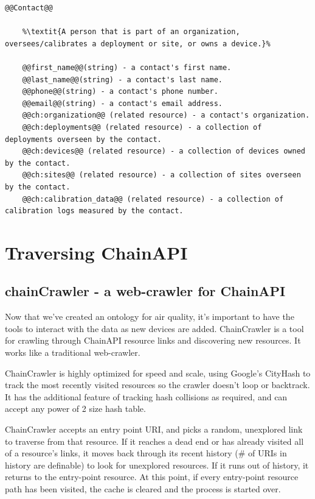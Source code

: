 \begin{lstlisting}[style=codedef]
@@Contact@@
	
	%\textit{A person that is part of an organization, oversees/calibrates a deployment or site, or owns a device.}%

	@@first_name@@(string) - a contact's first name.
	@@last_name@@(string) - a contact's last name.
	@@phone@@(string) - a contact's phone number.
	@@email@@(string) - a contact's email address.
	@@ch:organization@@ (related resource) - a contact's organization.
	@@ch:deployments@@ (related resource) - a collection of deployments overseen by the contact.
	@@ch:devices@@ (related resource) - a collection of devices owned by the contact.
	@@ch:sites@@ (related resource) - a collection of sites overseen by the contact.
	@@ch:calibration_data@@ (related resource) - a collection of calibration logs measured by the contact.

\end{lstlisting}






\section{Traversing ChainAPI}

\subsection{chainCrawler - a web-crawler for ChainAPI}

Now that we've created an ontology for air quality, it's important to have the tools to interact with the data as new devices are added.  ChainCrawler is a tool for crawling through ChainAPI resource links and discovering new resources.  It works like a traditional web-crawler.  

ChainCrawler is highly optimized for speed and scale, using Google's CityHash to track the most recently visited resources so the crawler doesn't loop or backtrack.  It has the additional feature of tracking hash collisions as required, and can accept any power of 2 size hash table.  

ChainCrawler accepts an entry point URI, and picks a random, unexplored link to traverse from that resource.  If it reaches a dead end or has already visited all of a resource's links, it moves back through its recent history (# of URIs in history are definable) to look for unexplored resources.  If it runs out of history, it returns to the entry-point resource.  At this point, if every entry-point resource path has been visited, the cache is cleared and the process is started over.

